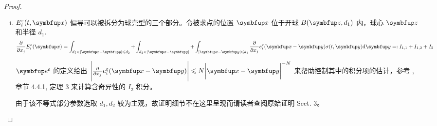 \begin{proof}
    \begin{enumerate}[(i)]
        \item $E_i^\varepsilon(t,\vx)$ 偏导可以被拆分为球壳型的三个部分。令被求点的位置 $\vx$ 位于开球 $B(\vect{z},d_1)$ 内，球心 $\vect{z}$ 和半径 $d_1$. 
        \begin{equation}
            \frac{\partial}{\partial x_j} E_i^\varepsilon(\vx)= \int_{d_1<|\vx-\vy|\leqslant d_2}+\int_{d_2<|\vx-\vy|}+\int_{|\vx-\vy|\leqslant d_1} \frac{\partial}{\partial x_j} e_i^\varepsilon (\vx - \vy) \sigma(t,\vy)\mathrm{d} \vy  =: I_{1,1} + I_{1,2} +I_{2}
        \end{equation}
    
        $\vect{e}^\varepsilon$ 的定义给出 $\Biggl|\frac{\partial}{\partial x_j} e_i^\varepsilon(\vx-\vy) \Biggr|\leqslant N\bigg|\vx-\vy\bigg|^{-N}$ 来帮助控制其中的积分项的估计，参考 \cite*{hellwig1964partial}, 章节 4.4.1, 定理 3 来计算含奇异性的 $I_2$ 积分。 
        
         由于该不等式部分参数选取 $d_1,d_2$ 较为主观，故证明细节不在这里呈现而请读者查阅原始证明 \cite*{HorstClasssicalI} Sect. 3。
         
    

    \end{enumerate}

    
\end{proof}

